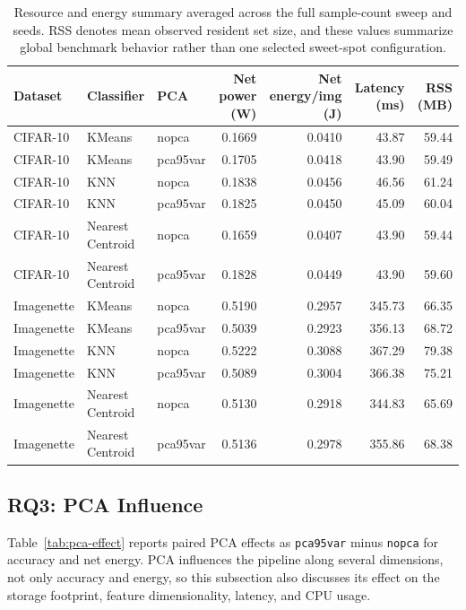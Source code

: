 \documentclass[sigconf,review,nonacm]{acmart}
\begin{document}
\begin{table}[t]
  \caption{Resource and energy summary averaged across the full sample-count sweep and seeds. RSS denotes mean observed resident set size, and these values summarize global benchmark behavior rather than one selected sweet-spot configuration.}
  \label{tab:resource-summary}
  \centering
  \footnotesize
  \begin{tabular}{@{}lllrrrr@{}}
    \toprule
    Dataset & Classifier & PCA & Net power (W) & Net energy/img (J) & Latency (ms) & RSS (MB) \\
    \midrule
    CIFAR-10 & KMeans & nopca & 0.1669 & 0.0410 & 43.87 & 59.44 \\
    CIFAR-10 & KMeans & pca95var & 0.1705 & 0.0418 & 43.90 & 59.49 \\
    CIFAR-10 & KNN & nopca & 0.1838 & 0.0456 & 46.56 & 61.24 \\
    CIFAR-10 & KNN & pca95var & 0.1825 & 0.0450 & 45.09 & 60.04 \\
    CIFAR-10 & Nearest Centroid & nopca & 0.1659 & 0.0407 & 43.90 & 59.44 \\
    CIFAR-10 & Nearest Centroid & pca95var & 0.1828 & 0.0449 & 43.90 & 59.60 \\
    Imagenette & KMeans & nopca & 0.5190 & 0.2957 & 345.73 & 66.35 \\
    Imagenette & KMeans & pca95var & 0.5039 & 0.2923 & 356.13 & 68.72 \\
    Imagenette & KNN & nopca & 0.5222 & 0.3088 & 367.29 & 79.38 \\
    Imagenette & KNN & pca95var & 0.5089 & 0.3004 & 366.38 & 75.21 \\
    Imagenette & Nearest Centroid & nopca & 0.5130 & 0.2918 & 344.83 & 65.69 \\
    Imagenette & Nearest Centroid & pca95var & 0.5136 & 0.2978 & 355.86 & 68.38 \\
    \bottomrule
  \end{tabular}
\end{table}

\subsection{RQ3: PCA Influence}
Table~\ref{tab:pca-effect} reports paired PCA effects as \texttt{pca95var} minus \texttt{nopca} for accuracy and net energy.
PCA influences the pipeline along several dimensions, not only accuracy and energy, so this subsection also discusses its effect on the storage footprint, feature dimensionality, latency, and CPU usage.
\end{document}
